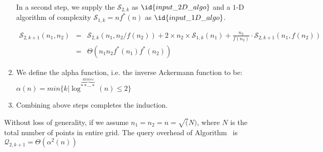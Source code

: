 \begin{IEEEproof}
\begin{enumerate}
  In a second step, we supply the $\mathcal{S}_{2, k}$ as 
  $\id{input\_2D\_algo}$ and a $1$-D algorithm of complexity 
  $\mathcal{S}_{1, k} = n f^*(n)$ as $\id{input\_1D\_algo}$.

  \begin{eqnarray}
    \mathcal{S}_{2, k+1}(n_1, n_2) & = & \mathcal{S}_{2, k} (n_1, n_2/f(n_2))
    + 2 \times n_2 \times \mathcal{S}_{1, k} (n_1) 
    + \frac{n_2}{f(n_2)} \cdot \mathcal{S}_{2, k+1}(n_1, f(n_2)) \\
        & = & \Theta(n_1 n_2 f^*(n_1) f^*(n_2))
  \label{eq:meta-2D-S2K1}
  \end{eqnarray}
\item We define the alpha function, i.e. the inverse Ackermann function to be:
  $\alpha(n) = min\{k \vert \log^{\overbrace{**\cdots*}^{k times}}(n) \leq 2\}$ 
  \cite{Seidel06}
\item Combining above steps completes the induction.
\end{enumerate}
\end{IEEEproof}

\begin{corollary}
Without loss of generality, if we assume $n_1 = n_2 = n = \sqrt(N)$, where
$N$ is the total number of points in entire grid.  The query overhead of
Algorithm~ is $\mathcal{Q}_{2, k+1} = \Theta(\alpha^2(n))$
\label{cor:meta-2D-query}
\end{corollary}

